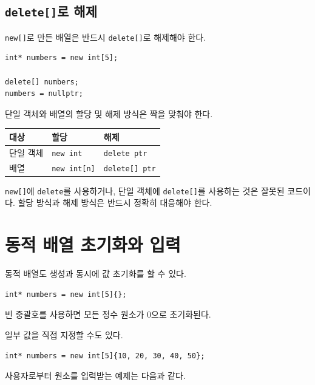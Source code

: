 \documentclass[11pt,a4paper]{article}
\begin{document}
\subsection{\texttt{delete[]}로 해제}

\texttt{new[]}로 만든 배열은 반드시 \texttt{delete[]}로 해제해야 한다.

\begin{lstlisting}
int* numbers = new int[5];

delete[] numbers;
numbers = nullptr;
\end{lstlisting}

단일 객체와 배열의 할당 및 해제 방식은 짝을 맞춰야 한다.

\begin{center}
\begin{tabular}{lll}
\toprule
대상 & 할당 & 해제 \\
\midrule
단일 객체 & \texttt{new int} & \texttt{delete ptr} \\
배열 & \texttt{new int[n]} & \texttt{delete[] ptr} \\
\bottomrule
\end{tabular}
\end{center}

\begin{importantbox}
\texttt{new[]}에 \texttt{delete}를 사용하거나, 단일 객체에 \texttt{delete[]}를 사용하는 것은 잘못된 코드이다.
할당 방식과 해제 방식은 반드시 정확히 대응해야 한다.
\end{importantbox}

\section{동적 배열 초기화와 입력}

동적 배열도 생성과 동시에 값 초기화를 할 수 있다.

\begin{lstlisting}
int* numbers = new int[5]{};
\end{lstlisting}

빈 중괄호를 사용하면 모든 정수 원소가 0으로 초기화된다.

일부 값을 직접 지정할 수도 있다.

\begin{lstlisting}
int* numbers = new int[5]{10, 20, 30, 40, 50};
\end{lstlisting}

사용자로부터 원소를 입력받는 예제는 다음과 같다.
\end{document}
